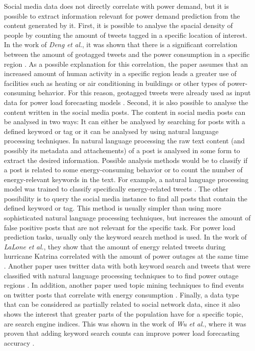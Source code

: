 Social media data does not directly correlate with power demand, but it is
possible to extract information relevant for power demand prediction
from the content generated by it.
First, it is possible to analyse the spacial density of people by 
counting the amount of tweets tagged in a specific location of interest. 
In the work of \textit{Deng et al.},
it was shown that there is a significant
correlation between the amount of geotagged tweets
and the power consumption in a specific region \cite{twittergeoloccorr}.
As a possible explanation for this correlation, the paper assumes that 
an increased amount of human activity in a specific region leads a greater 
use of facilities such as heating or air conditioning in buildings or 
other types of power-consuming behavior.
For this reason, geotagged tweets were already used as input data for 
power load forecasting models 
\cite{twittergeolocforecasting} \cite{twittergeolocforecasting2}.
Second, it is also possible to analyse the content written in the 
social media posts. The content in social media posts can be 
analysed in two ways: 
It can either be analysed by searching for posts with a defined keyword or tag
or it can be analysed by using natural language processing techniques. 
In natural language processing the raw text content 
(and possibly its metadata and attachements) of a post is analysed
in some form to extract the desired information. Possible analysis
methods would be to classify if a post is related to some energy-consuming
behavior or to count the number of energy-relevant keywords in the text.
For example, a natural language processing model was trained to 
classify specifically energy-related tweets \cite{energybert}.
The other possibility is to query the social media instance 
to find all posts that contain the defined keyword or tag.
This method is usually simpler than using more sophisticated natural 
language processing techniques, but increases the amount of false positive 
posts that are not relevant for the specific task.
For power load prediction tasks, usually only the keyword search method is used.
In the work of \textit{LaLone et al.}, they show that the amount of energy
related tweets during hurricane Katrina correlated with the amount of 
power outages at the same time \cite{poweroutagetwitter}.
Another paper uses twitter data with both keyword search and 
tweets that were classified with natural language processing techniques to
to find power outage regions \cite{twitterpoweroutagelighttime}.
In addition, another paper used topic mining techniques to find
events on twitter posts that correlate with energy consumption 
\cite{twittertopicevent}.
Finally, a data type that can be considered as partially related to social 
network data, since it also shows the interest that greater parts of 
the population have for a specific topic, are search engine indices.
This was shown in the work of \textit{Wu et al.}, where it was proven that adding 
keyword search counts can improve power load forecasting accuracy 
\cite{googlepowerforecast}.

